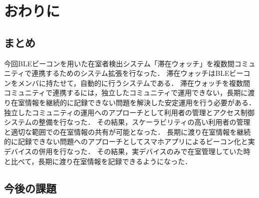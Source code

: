 \chapter{おわりに}\label{5}
\thispagestyle{myheadings}

\section{まとめ}

今回BLEビーコンを用いた在室者検出システム「滞在ウォッチ」を複数間コミュニティで連携するためのシステム拡張を行なった．
滞在ウォッチはBLEビーコンをメンバに持たせて，自動的に行うシステムである．
滞在ウォッチを複数間コミュニティで連携するには，独立したコミュニティで運用できない，長期に渡り在室情報を継続的に記録できない問題を解決した安定運用を行う必要がある．
独立したコミュニティの運用へのアプローチとして利用者の管理とアクセス制御システムの整備を行なった．
その結果，スケーラビリティの高い利用者の管理と適切な範囲での在室情報の共有が可能となった．
長期に渡り在室情報を継続的に記録できない問題へのアプローチとしてスマホアプリによるビーコン化と実デバイスの併用を行なった．
その結果，実デバイスのみで在室管理していた時と比べて，長期に渡り在室情報を記録できるようになった．


\section{今後の課題}

